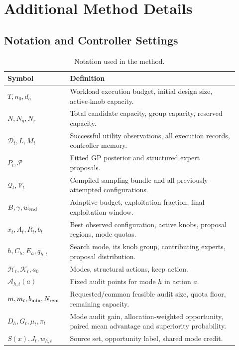 \section{Additional Method Details}\label{sec:ct-reproducibility}

\subsection{Notation and Controller Settings}

\begin{table}[htbp]
\caption{Notation used in the method.}\label{tab:ct-symbols}
\centering\small
\begin{tabular}{>{\raggedright\arraybackslash}p{0.23\linewidth}>{\raggedright\arraybackslash}p{0.69\linewidth}}
\toprule
Symbol & Definition \\
\midrule
$T,n_0,d_a$ & Workload execution budget, initial design size, active-knob capacity. \\
$N,N_g,N_r$ & Total candidate capacity, group capacity, reserved capacity. \\
$\mathcal D_t,L,M_t$ & Successful utility observations, all execution records, controller memory.
\\
$P_t,\mathcal P$ & Fitted GP posterior and structured expert proposals.
\\
$\mathcal Q_t,\mathcal V_t$ & Compiled sampling bundle and all previously attempted configurations.
\\
$B,\gamma,w_{\rm end}$ & Adaptive budget, exploitation fraction, final exploitation window. \\
$\bar x_t,A_t,R_t,b_t$ & Best observed configuration, active knobs, proposal regions, mode quotas. \\
$h,C_h,E_h,q_{h,t}$ & Search mode, its knob group, contributing experts, proposal distribution. \\
$\mathcal H_t,\mathcal K_t,a_0$ & Modes, structural actions, keep action. \\
$\mathcal A_{h,t}(a)$ & Fixed audit points for mode $h$ in action $a$. \\
$m,m_t,b_{\min},N_{\rm rem}$ & Requested/common feasible audit size, quota floor, remaining capacity. \\
$D_h,G_t,\mu_t,\pi_t$ & Mode audit gain, allocation-weighted opportunity, paired mean advantage and superiority probability. \\
$S(x),J_t,w_{h,t}$ & Source set, opportunity label, shared mode credit. \\

\end{tabular}
\end{table}
